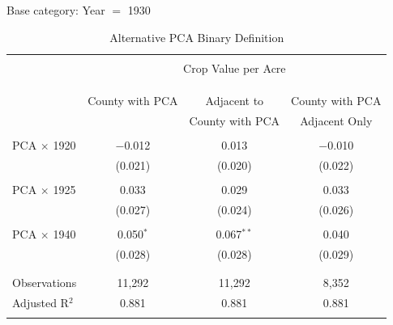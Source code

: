 \documentclass[12pt]{article}
\begin{document}
\begin{appendices}
\begin{table}[!htbp] \centering 
    \caption{Alternative PCA Binary Definition} 
    \label{pca_binary_adj} 

    Base category: Year $=$ 1930

    \begin{threeparttable}[t]
\footnotesize   
\begin{tabular}{@{\extracolsep{5pt}}lccc} 
    \\[-1.8ex]\hline 
    \hline \\[-1.8ex] 
     & \multicolumn{3}{c}{Crop Value per Acre} \\ 
    \cline{2-4} 
    \\[-1.8ex] &  & &  \\ 
    \\[-1.8ex] & County with PCA & Adjacent to     & County with PCA\\ 
               &                 & County with PCA & Adjacent Only \\
    \hline \\[-1.8ex] 
    
    PCA $\times$ 1920         & $-$0.012              & 0.013       & $-$0.010          \\
                              & (0.021)               & (0.020)     & (0.022)           \\
                              &                       &             &                   \\
    PCA $\times$ 1925         & 0.033                 & 0.029       & 0.033             \\
                              & (0.027)               & (0.024)     & (0.026)           \\
                              &                       &             &                   \\
    PCA $\times$ 1940         & 0.050$^{*}$           & 0.067$^{**}$& 0.040             \\
                              & (0.028)               & (0.028)     & (0.029)           \\
                              &            &             &          \\
    \hline \\[-1.8ex] 
    
    Observations & 11,292 & 11,292 & 8,352 \\ 
    Adjusted R$^{2}$ & 0.881 & 0.881 & 0.881 \\ 
    \hline 
    \hline \\[-1.8ex] 


\end{tabular}
\end{threeparttable}
\end{table}
\end{appendices}
\end{document}
